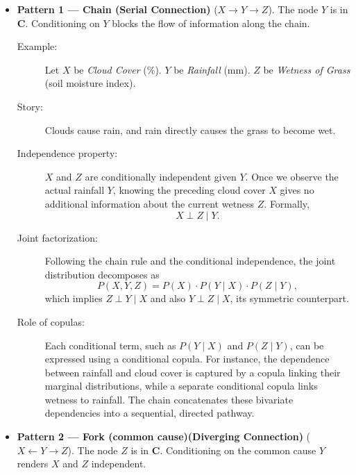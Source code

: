 \begin{itemize}
\item \textbf{Pattern 1 — Chain (Serial Connection)} ($X \to Y \to Z$).
The node $Y$ is in $\mathbf{C}$. Conditioning on $Y$ blocks the flow of
information along the chain.

\begin{description}
\item[Example:] Let \(X\) be \emph{Cloud Cover} (\%). \(Y\) be \emph{Rainfall} (mm). \(Z\) be \emph{Wetness of Grass} (soil moisture index).
\item[Story:] Clouds cause rain, and rain directly causes the grass to become wet.
\item[Independence property:] \(X\) and \(Z\) are conditionally independent given \(Y\). Once we observe the actual rainfall \(Y\), knowing the preceding cloud cover \(X\) gives no additional information about the current wetness \(Z\). Formally,
\[
X \perp Z \mid Y.
\]
\item[Joint factorization:] Following the chain rule and the conditional independence, the joint distribution decomposes as
\[
P(X,Y,Z) = P(X) \cdot P(Y \mid X) \cdot P(Z \mid Y),
\]
which implies $Z \perp Y \mid X$ and also $Y \perp Z \mid X$, its symmetric counterpart.
\item[Role of copulas:] Each conditional term, such as \(P(Y \mid X)\) and \(P(Z \mid Y)\), can be expressed using a conditional copula. For instance, the dependence between rainfall and cloud cover is captured by a copula linking their marginal distributions, while a separate conditional copula links wetness to rainfall. The chain concatenates these bivariate dependencies into a sequential, directed pathway.
\end{description}

\item \textbf{Pattern 2 — Fork (common cause)(Diverging Connection)} ($X \leftarrow Y \to Z$).
The node $Z$ is in $\mathbf{C}$. Conditioning on the common cause $Y$ renders
$X$ and $Z$ independent.


\end{itemize}
